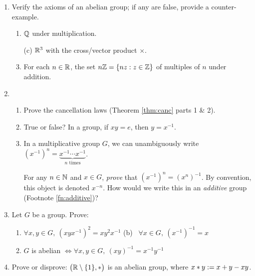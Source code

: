 \begin{exercises}
\begin{enumerate}
	
	  
		\item Verify the axioms of an abelian group; if any are false, provide a counter-example.
		\begin{enumerate}
		  \item {} $\mathbb{Q}$ under multiplication.\setcounter{enumii}{2}
		  
		  \item[(c)]  $\mathbb{R}^3$ with the cross/vector product $\times$.\setcounter{enumii}{4}
		  
		  \item\label{exs:nzgroup} For each $n\in\mathbb{R}$, the set $n\mathbb{Z}=\{nz:z\in\mathbb{Z}\}$ of multiples of $n$ under addition.
	  \end{enumerate}
	  
	  
	  \item\begin{enumerate}
	    \item Prove the cancellation laws (Theorem \ref{thm:canc} parts 1 \& 2).
	    
	    \item True or false? In a group, if $xy=e$, then $y=x^{-1}$.
	    
	    \item\label{exs:multinverse2} In a multiplicative group $G$, we can unambiguously write	$(x^{-1})^n=\underbrace{x^{-1}\cdots x^{-1}}_{n\text{ times}}$.\par
	    For any $n\in\mathbb{N}$ and $x\in G$, \emph{prove} that $(x^{-1})^n=(x^n)^{-1}$. By convention, this object is denoted $x^{-n}$. How would we write this in an \emph{additive} group (Footnote \ref{fn:additive})?
	  \end{enumerate}
	    
	    
	  \item Let $G$ be a group. Prove:
	  \begin{enumerate}
	    \item $\forall x,y\in G,\ (xy x^{-1})^2=xy^2x^{-1}$
	    \qquad\qquad
	    (b) \ $\forall x\in G,\ (x^{-1})^{-1}=x$
	    \setcounter{enumii}{2}
	    \item $G$ is abelian $\iff\forall x,y\in G,\ (xy)^{-1}=x^{-1}y^{-1}$
	  \end{enumerate}
	  
	  
	   \item\label{exs:pullback1} Prove or disprove: $\bigl(\mathbb{R}\setminus\{1\},*\bigr)$ is an abelian group, where $x\mathbin{\ast} y:=x+y-xy$.
	

\end{enumerate}
\end{exercises}
